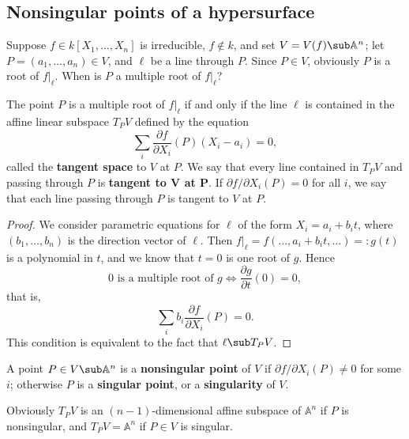 \subsection{Nonsingular points of a hypersurface}
Suppose $f\in k[X_1,\dots,X_n]$ is irreducible, $f\notin k$, and set $V=V(f)\sub\mathbb{A}^n$; let $P=(a_1,\dots,a_n)\in V$, and $\ell$ be a line through $P$. Since $P\in V$, obviously $P$ is a root of $f|_{\ell}$. When is $P$ a multiple root of $f|_{\ell}$?
\begin{proposition}
The point $P$ is a multiple root of $f|_{\ell}$ if and only if the line $\ell$ is contained in the affine linear subspace $T_PV$ defined by the equation
\[\sum_i\frac{\partial f}{\partial X_i}(P)(X_i-a_i)=0,\]
called the \textbf{tangent space} to $V$ at $P$. We say that every line
contained in $T_PV$ and passing through $P$ is \textbf{tangent to $\bm{V}$ at $\bm{P}$}. If $\partial f/\partial X_i(P)=0$ for all $i$, we say that each line passing
through $P$ is tangent to $V$ at $P$.
\end{proposition}
\begin{proof}
We consider parametric equations for $\ell$ of the form $X_i=a_i+b_it$, where $(b_1,\dots,b_n)$ is the direction vector of $\ell$. Then $f|_{\ell}=f(\dots,a_i+b_it,\dots)=:g(t)$ is a polynomial in $t$, and we know that $t=0$ is one root of $g$. Hence
\[\text{$0$ is a multiple root of $g$}\iff\frac{\partial g}{\partial t}(0)=0,\]
that is,
\[\sum_ib_i\frac{\partial f}{\partial X_i}(P)=0.\]
This condition is equivalent to the fact that $\ell\sub T_PV$.
\end{proof}
\begin{definition}
A point $P\in V\sub\mathbb{A}^n$ is a \textbf{nonsingular point} of $V$ if $\partial f/\partial X_i(P)\neq 0$ for some $i$; otherwise $P$ is a \textbf{singular point}, or a \textbf{singularity} of $V$.
\end{definition}
Obviously $T_PV$ is an $(n-1)$-dimensional affine subspace of $\mathbb{A}^n$ if $P$ is nonsingular, and $T_PV=\mathbb{A}^n$ if $P\in V$ is singular.
